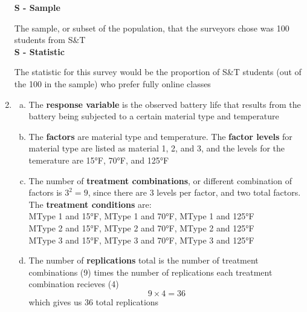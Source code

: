 \documentclass[14pt]{article}
\newcommand{\bd}{\textbf}
\begin{document}
\begin{enumerate}
\bd{S - Sample} 

The sample, or subset of the population, that the surveyors chose was 100 students from S\&T \\

\bd{S - Statistic} 

The statistic for this survey would be the proportion of S\&T students (out of the 100 in the sample) who prefer fully online classes \\



\item

\begin{enumerate}[(a)]

\item
The \bd{response variable} is the observed battery life that results from the battery being subjected to a certain material type and temperature 

\item 
The \bd{factors} are material type and temperature. The \bd{factor levels} for material type are listed as material 1, 2, and 3, and the levels for the temerature are 15\si{\degree}F, 70\si{\degree}F, and 125\si{\degree}F 

\item
The number of \bd{treatment combinations}, or different combination of factors is $3^2 = 9$, since there are 3 levels per factor, and two total factors. The \bd{treatment conditions} are: \\

MType 1 and 15\si{\degree}F, MType 1 and 70\si{\degree}F, MType 1 and 125\si{\degree}F \\
MType 2 and 15\si{\degree}F, MType 2 and 70\si{\degree}F, MType 2 and 125\si{\degree}F \\
MType 3 and 15\si{\degree}F, MType 3 and 70\si{\degree}F, MType 3 and 125\si{\degree}F \\

\item
The number of \bd{replications} total is the number of treatment combinations (9) times the number of replications each treatment combination recieves (4)
\[
9 \times 4 = 36
\]
which gives us 36 total replications 

\end{enumerate}

\end{enumerate}
\end{document}
